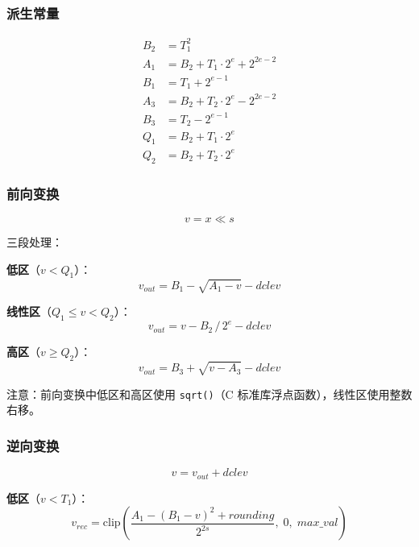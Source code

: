 \subsubsection{派生常量}

\begin{align}
B_2 &= T_1^2 \\
A_1 &= B_2 + T_1 \cdot 2^e + 2^{2e-2} \\
B_1 &= T_1 + 2^{e-1} \\
A_3 &= B_2 + T_2 \cdot 2^e - 2^{2e-2} \\
B_3 &= T_2 - 2^{e-1} \\
Q_1 &= B_2 + T_1 \cdot 2^e \\
Q_2 &= B_2 + T_2 \cdot 2^e
\end{align}

\subsubsection{前向变换}

\begin{equation}
v = x \ll s
\end{equation}

三段处理：

\textbf{低区}（$v < Q_1$）：
\begin{equation}
v_{\mathit{out}} = B_1 - \sqrt{A_1 - v} - \mathit{dclev}
\end{equation}

\textbf{线性区}（$Q_1 \leq v < Q_2$）：
\begin{equation}
v_{\mathit{out}} = v - B_2 \,/\, 2^e - \mathit{dclev}
\end{equation}

\textbf{高区}（$v \geq Q_2$）：
\begin{equation}
v_{\mathit{out}} = B_3 + \sqrt{v - A_3} - \mathit{dclev}
\end{equation}

注意：前向变换中低区和高区使用 \texttt{sqrt()}（C 标准库浮点函数），线性区使用整数右移。

\subsubsection{逆向变换}

\begin{equation}
v = v_{\mathit{out}} + \mathit{dclev}
\end{equation}

\textbf{低区}（$v < T_1$）：
\begin{equation}
v_{\mathit{rec}} = \mathrm{clip}\!\left(\frac{A_1 - (B_1 - v)^2 + \mathit{rounding}}{2^{2s}},\; 0,\; \mathit{max\_val}\right)
\end{equation}

